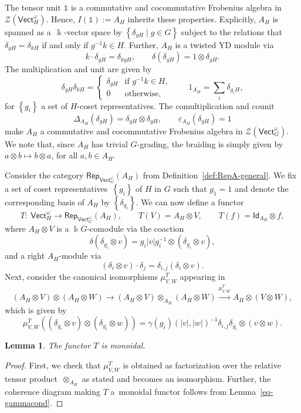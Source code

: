 \documentclass[10pt,a4paper]{amsart}
\numberwithin{equation}{section}
\newtheorem{Lemma}[Theorem]{Lemma}
\newcommand{\Set}[1]{\left\lbrace #1\right\rbrace}
\newcommand{\ide}{\mathsf{Id}}
\newcommand{\one}{\mathds{1}}
\newcommand{\Rep}{\mathsf{Rep}}
\newcommand{\Vect}{\mathsf{Vect}}
\newcommand{\cZ}{\mathcal{Z}}
\newcommand{\rI}{I}
\begin{document}
\begin{Example}\label{ex:AH}
The tensor unit $\one$ is a commutative and cocommutative Frobenius algebra in~$\cZ( \Vect_H^\omega)$. Hence, $\rI(\one):=A_H$ inherits these properties. Explicitly, $A_H$ is spanned as a~$\Bbbk$-vector space by $\Set{\delta_{gH}\mid g\in G }$ subject to the relations that $\delta_{gH}=\delta_{kH}$ if and only if $g^{-1}k\in H$. Further, $A_H$ is a twisted YD module via
\[
k\cdot \delta_{gH}=\delta_{kgH}, \qquad \delta(\delta_{gH})=1\otimes \delta_{gH}.
\]
The multiplication and unit are given by
\[\delta_{gH}\delta_{kH}=\begin{cases}\delta_{gH} & \text{if $g^{-1}k\in H$},\\ 0 & \text{otherwise},\end{cases}
\qquad 1_{A_H}=\sum_{i}\delta_{g_iH},\]
for $\Set{g_i}$ a set of $H$-coset representatives. The comultiplication and counit
\[\Delta_{A_H}(\delta_{gH})=\delta_{gH}\otimes \delta_{gH}, \qquad \varepsilon_{A_H}(\delta_{gH})=1\]
make $A_H$ a commutative and cocommutative Frobenius algebra in $\cZ( \Vect_G^\omega)$. We note that, since $A_H$ has trivial $G$-grading, the braiding is simply given by
$a\otimes b\mapsto b\otimes a$, for all $a,b\in A_H$.
\end{Example}


Consider the category $\Rep_{\Vect_G^\omega}(A_H)$ from Definition~\ref{def:RepA-general}. We fix a set of coset representatives~$\Set{g_i}$ of $H$ in $G$ such that $g_1=1$ and denote the corresponding basis of $A_H$ by $\Set{\delta_{g_i}}$. We can now define a functor
\[T\colon\ \Vect_H^\omega\to \Rep_{\Vect_G^\omega}(A_H), \qquad T(V)= A_H\otimes V,\qquad T(f)=\ide_{A_H}\otimes f,\]
where $A_H\otimes V$ is a $\Bbbk G$-comodule via the coaction
\[\delta(\delta_{g_i}\otimes v)=g_i|v|g_i^{-1}\otimes (\delta_{g_i}\otimes v),\]
and a right $A_H$-module via
\[(\delta_i\otimes v)\cdot \delta_j= \delta_{i,j}(\delta_i\otimes v).\]
Next, consider the canonical isomorphisms $\mu^T_{V,W}$ appearing in
\[(A_H\otimes V)\otimes (A_H\otimes W)\to (A_H\otimes V)\otimes_{A_H} (A_H\otimes W)\xrightarrow{\mu^T_{V,W}} A_H\otimes (V\otimes W),\]
which is given by
\[\mu^T_{V,W}((\delta_{g_i}\otimes v)\otimes (\delta_{g_i}\otimes w))=\gamma(g_i)(|v|,|w|)^{-1}\delta_{i,j}\delta_{g_i}\otimes (v\otimes w).\]
\begin{Lemma}\label{lem:T-monoidal}
 The functor $T$ is monoidal.
\end{Lemma}
\begin{proof}
First, we check that $\mu^T_{V,W}$ is obtained as factorization over the relative tensor product~$\otimes_{A_H}$ as stated and becomes an isomorphism. Further, the coherence diagram making $T$ a~monoidal functor follows from Lemma~\ref{eq-gammacond}.
\end{proof}
\end{document}
